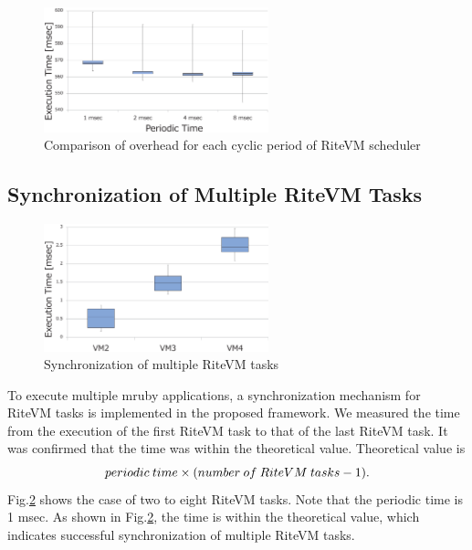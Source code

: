 \documentclass[S,R,E]{article/compsoft}
\begin{document}
{\begin{figure}[t]
    \centering
    \includegraphics[width=6.5cm,clip]{figure/comparison_msec.eps}
\caption{Comparison of overhead for each cyclic period of RiteVM scheduler}
\label{fig:comparison_msec}
\end{figure}


\subsection{Synchronization of Multiple RiteVM Tasks}

 \begin{figure}[t]
    \centering
    \includegraphics[width=6.5cm,clip]{figure/eval_synchronization.eps}
\caption{Synchronization of multiple RiteVM tasks}
\label{fig:eval_synchronization}
\end{figure}

To execute multiple mruby applications, a synchronization mechanism for RiteVM tasks is implemented in the proposed framework.
We measured the time from the execution of the first RiteVM task to that of the last RiteVM task.
It was confirmed that the time was within the theoretical value. Theoretical value is 
\begin{displaymath}
    {\scriptsize periodic\ time \times (number\ of\ RiteVM\ tasks - 1).}
\end{displaymath}
Fig.\ref{fig:eval_synchronization} shows the case of two to eight RiteVM tasks.
Note that the periodic time is 1 msec.
As shown in Fig.\ref{fig:eval_synchronization}, the time is within the theoretical value, which indicates successful synchronization of multiple RiteVM tasks.




}
\end{document}

